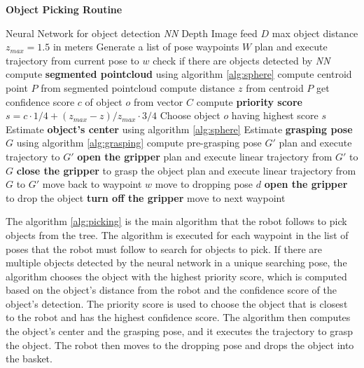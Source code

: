 \begin{algorithm}[H]
    \caption{\textbf{Object Picking Routine}}
    \label{alg:picking}
    \begin{algorithmic}[1]
        \Require Neural Network for object detection \textit{NN}
        \Require Depth Image feed $D$
        \State max object distance $z_{max} = 1.5$ in meters
        \State Generate a list of pose waypoints $W$
            \State plan and execute trajectory from current pose to $w$
            \State check if there are objects detected by \textit{NN}
                \State compute \textbf{segmented pointcloud} using algorithm \ref{alg:sphere}
                \State compute centroid point $P$ from segmented pointcloud
                \State compute distance $z$ from centroid $P$
                \State get confidence score $c$ of object $o$ from vector $C$
                \State compute \textbf{priority score} $s = c \cdot 1/4 + (z_{max} - z)/z_{max} \cdot 3/4$
            \EndFor
            \State Choose object $o$ having highest score $s$
        \EndFor
        \State Estimate \textbf{object's center} using algorithm \ref{alg:sphere}
        \State Estimate \textbf{grasping pose} $G$ using algorithm \ref{alg:grasping}
            \State compute pre-grasping pose $G'$
            \State plan and execute trajectory to $G'$
            \State \textbf{open the gripper}
            \State plan and execute linear trajectory from $G'$ to $G$
            \State \textbf{close the gripper} to grasp the object
            \State plan and execute linear trajectory from $G$ to $G'$
            \State move back to waypoint $w$
            \State move to dropping pose $d$
            \State \textbf{open the gripper} to drop the object
            \State \textbf{turn off the gripper}
        \Else
            \State move to next waypoint
        \EndIf
    \end{algorithmic}
\end{algorithm}

The algorithm \ref{alg:picking} is the main algorithm that the robot follows to pick objects from the tree.
The algorithm is executed for each waypoint in the list of poses that the robot must follow to search
for objects to pick. If there are multiple objects detected by the neural network in a unique searching pose,
the algorithm chooses the object with the highest priority score, which is computed based on the object's distance
from the robot and the confidence score of the object's detection. The priority score is used to choose the object
that is closest to the robot and has the highest confidence score. The algorithm then computes the object's center
and the grasping pose, and it executes the trajectory to grasp the object. The robot then moves to the dropping pose
and drops the object into the basket. 

